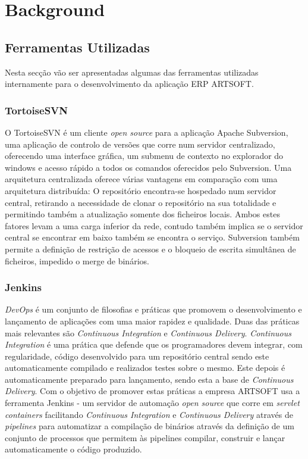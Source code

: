 \documentclass[sigplan]{acmart}
\begin{document}
\section{Background} \label{sec:background}

\subsection{Ferramentas Utilizadas}

Nesta secção vão ser apresentadas algumas das ferramentas utilizadas internamente para o desenvolvimento da aplicação ERP ARTSOFT.

\subsubsection{TortoiseSVN}

O TortoiseSVN é um cliente \textit{open source} para a aplicação Apache Subversion, uma aplicação de controlo de versões que corre num servidor centralizado, oferecendo uma interface gráfica, um submenu de contexto no explorador do windows e acesso rápido a todos os comandos oferecidos pelo Subversion. Uma arquitetura centralizada oferece várias vantagens em comparação com uma arquitetura distribuída: O repositório encontra-se hospedado num servidor central, retirando a necessidade de clonar o repositório na sua totalidade e permitindo também a atualização somente dos ficheiros locais. Ambos estes fatores levam a uma carga inferior da rede, contudo também implica se o servidor central se encontrar em baixo também se encontra o serviço. Subversion também permite a definição de restrição de acessos e o bloqueio de escrita simultânea de ficheiros, impedido o merge de binários.

\subsubsection{Jenkins}

\textit{DevOps} é um conjunto de filosofias e práticas que promovem o desenvolvimento e lançamento de aplicações com uma maior rapidez e qualidade. Duas das práticas mais relevantes são \textit{Continuous Integration} e \textit{Continuous Delivery}. \textit{Continuous Integration} é uma prática que defende que os programadores devem integrar, com regularidade, código desenvolvido para um repositório central sendo este automaticamente compilado e realizados testes sobre o mesmo. Este depois é automaticamente preparado para lançamento, sendo esta a base de \textit{Continuous Delivery}. Com o objetivo de promover estas práticas a empresa ARTSOFT usa a ferramenta Jenkins - um servidor de automação \textit{open source} que corre em \textit{servlet containers} facilitando \textit{Continuous Integration} e \textit{Continuous Delivery} através de \textit{pipelines} para automatizar a compilação de binários através da definição de um conjunto de processos que permitem às pipelines compilar, construir e lançar automaticamente o código produzido.
\end{document}
